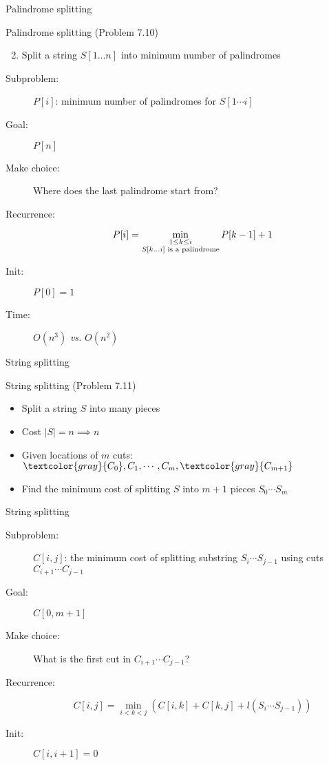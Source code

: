 \begin{frame}{Palindrome splitting}
  \begin{exampleblock}{Palindrome splitting (Problem 7.10)}
	\begin{enumerate}[(1)]
	  \setcounter{enumi}{1}
	  \item Split a string $S[1 \dots n]$ into minimum number of palindromes
    \end{enumerate}
  \end{exampleblock}

  \begin{description}
	\item[Subproblem:] $P[i]$: minimum number of palindromes for $S[1 \cdots i]$
	\item[Goal:] $P[n]$
	  \pause
	\item[Make choice:] Where does the last palindrome start from?
	\item[Recurrence:] 
	  \[
		P[i] = \min_{\begin{subarray}{c}
			1 \le k \le i \\
			S[k \dots i] \text{ is a palindrome}
		  \end{subarray}} P[k-1] + 1
	  \]
	  \pause
	\item[Init:] $P[0] = 1$
	\item[Time:] $O(n^3)$ \emph{vs.} $O(n^2)$
  \end{description}
\end{frame}
\begin{frame}{String splitting}
  \begin{exampleblock}{String splitting (Problem 7.11)}
    \begin{itemize}
      \item Split a string $S$ into many pieces
      \item Cost $|S| = n \implies n$
      \item Given locations of $m$ cuts: $\textcolor{gray}{C_{0}}, C_{1}, \cdots, C_{m}, \textcolor{gray}{C_{m+1}}$
      \item Find the minimum cost of splitting $S$ into $m+1$ pieces $S_{0} \cdots S_{m}$
    \end{itemize}
  \end{exampleblock}
\end{frame}
\begin{frame}{String splitting}
  \begin{description}
	\item[Subproblem:] $C[i,j]$: the minimum cost of splitting substring $S_{i} \cdots S_{j-1}$ using cuts $C_{i+1} \cdots C_{j-1}$
	\item[Goal:] $C[0,m+1]$
	  \pause
	\item[Make choice:] What is the first cut in $C_{i+1} \cdots C_{j-1}$?
	\item[Recurrence:] 
	  \[
		C[i,j] = \min_{i < k < j} \left(C[i,k] + C[k,j] + l(S_{i} \cdots S_{j-1}) \right)
	  \]
	  \pause
	\item[Init:] $C[i, i+1] = 0$
  \end{description}
\end{frame}
